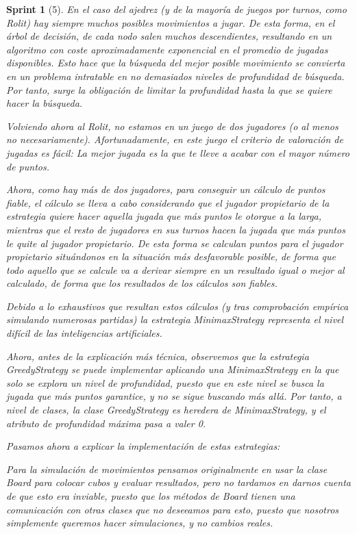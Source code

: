\documentclass[12pt,a4paper,openright]{book}
\theoremstyle{break}
\newtheorem*{sprint}{Sprint}
\begin{document}
\begin{sprint}[5]
En el caso del ajedrez (y de la mayoría de juegos por turnos, como Rolit) hay siempre muchos posibles movimientos a jugar. De esta forma, en el árbol de decisión, de cada nodo salen muchos descendientes, resultando en un algoritmo con coste aproximadamente exponencial en el promedio de jugadas disponibles. Esto hace que la búsqueda del mejor posible movimiento se convierta en un problema intratable en no demasiados niveles de profundidad de búsqueda. Por tanto, surge la obligación de limitar la profundidad hasta la que se quiere hacer la búsqueda.

Volviendo ahora al Rolit, no estamos en un juego de dos jugadores (o al menos no necesariamente).
Afortunadamente, en este juego el criterio de valoración de jugadas es fácil: La mejor jugada es la que te lleve a acabar con el mayor número de puntos.

Ahora, como hay más de dos jugadores, para conseguir un cálculo de puntos fiable, el cálculo se lleva a cabo considerando que el jugador propietario de la estrategia quiere hacer aquella jugada que más puntos le otorgue a la larga, mientras que el resto de jugadores en sus turnos hacen la jugada que más puntos le quite al jugador propietario. De esta forma se calculan puntos para el jugador propietario situándonos en la situación más desfavorable posible, de forma que todo aquello que se calcule va a derivar siempre en un resultado igual o mejor al calculado, de forma que los resultados de los cálculos son fiables.

Debido a lo exhaustivos que resultan estos cálculos (y tras comprobación empírica simulando numerosas partidas) la estrategia MinimaxStrategy representa el nivel difícil de las inteligencias artificiales.

Ahora, antes de la explicación más técnica, observemos que la estrategia GreedyStrategy se puede implementar aplicando una MinimaxStrategy en la que solo se explora un nivel de profundidad, puesto que en este nivel se busca la jugada que más puntos garantice, y no se sigue buscando más allá. Por tanto, a nivel de clases, la clase GreedyStrategy es heredera de MinimaxStrategy, y el atributo de profundidad máxima pasa a valer 0.

Pasamos ahora a explicar la implementación de estas estrategias:

Para la simulación de movimientos pensamos originalmente en usar la clase Board para colocar cubos y evaluar resultados, pero no tardamos en darnos cuenta de que esto era inviable, puesto que los métodos de Board tienen una comunicación con otras clases que no deseeamos para esto, puesto que nosotros simplemente queremos hacer simulaciones, y no cambios reales.


\end{sprint}
\end{document}
